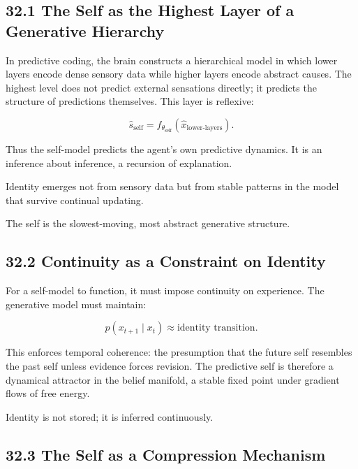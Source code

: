 \documentclass[12pt,letterpaper]{article}
\theoremstyle{remark}
\begin{document}
\subsection{32.1 The Self as the Highest Layer of a Generative Hierarchy}

In predictive coding, the brain constructs a hierarchical model in which lower layers encode dense sensory data while higher layers encode abstract causes. The highest level does not predict external sensations directly; it predicts the structure of predictions themselves. This layer is reflexive:

\[
\hat{s}_{\text{self}} = f_{\theta_{\text{self}}}(\hat{x}_{\text{lower-layers}}).
\]

Thus the self-model predicts the agent's own predictive dynamics. It is an inference about inference, a recursion of explanation.

Identity emerges not from sensory data but from stable patterns in the model that survive continual updating.

The self is the slowest-moving, most abstract generative structure.

\subsection{32.2 Continuity as a Constraint on Identity}

For a self-model to function, it must impose continuity on experience.  
The generative model must maintain:

\[
p(x_{t+1} \mid x_t) \approx \text{identity transition}.
\]

This enforces temporal coherence: the presumption that the future self resembles the past self unless evidence forces revision. The predictive self is therefore a dynamical attractor in the belief manifold, a stable fixed point under gradient flows of free energy.

Identity is not stored; it is inferred continuously.

\subsection{32.3 The Self as a Compression Mechanism}
\end{document}
